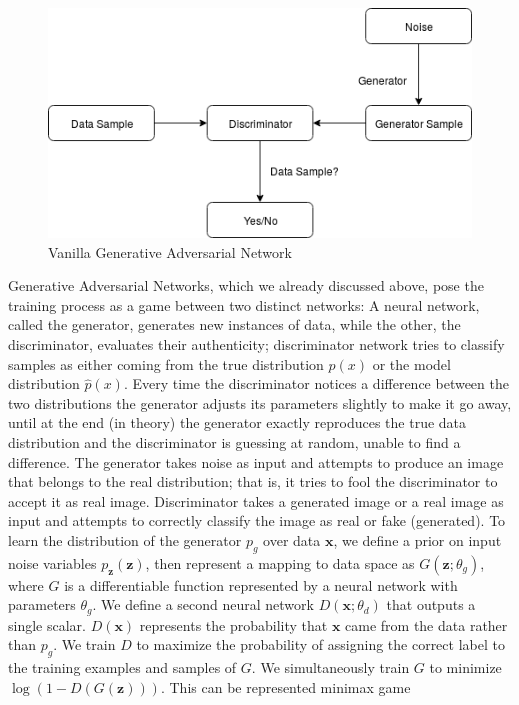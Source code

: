 \documentclass{vldb}
\begin{document}
\label{sec:generative_adversarial_networks}
\begin{figure}[H]
\includegraphics[width=\linewidth]{../Final_Report/images/vanillaGAN.png}
\caption{Vanilla Generative Adversarial Network}
\label{fig:gans}
\end{figure}

Generative Adversarial Networks, which we already discussed above, pose the training process as a game between two distinct networks: A neural network, called the generator, generates new instances of data, while the other, the discriminator, evaluates their authenticity; discriminator network tries to classify samples as either coming from the true distribution $p(x)$ or the model distribution $\hat{p}(x)$. Every time the discriminator notices a difference between the two distributions the generator adjusts its parameters slightly to make it go away, until at the end (in theory) the generator exactly reproduces the true data distribution and the discriminator is guessing at random, unable to find a difference.
The generator takes noise as input and attempts to produce an image that belongs to the real distribution; that is, it tries to fool the discriminator to accept it as real image. Discriminator takes a generated image or a real image as input and attempts to correctly classify the image as real or fake (generated).
To learn the distribution of the generator $p_g$ over data $\bm{x}$, we define a prior on input noise variables $p_{\bm{z}}(\bm{z})$, then represent a mapping to data space as $G(\bm{z}; \theta_g)$, where $G$ is a differentiable function represented by a neural network with parameters $\theta_g$. We define a second neural network $D(\bm{x}; \theta_d)$ that outputs a single scalar. $D(\bm{x})$ represents the probability that $\bm{x}$ came from the data rather than $p_g$. We train $D$ to maximize the probability of assigning the correct label to the training examples and samples of $G$. We simultaneously train $G$ to minimize $\log(1-D(G(\bm{z})))$.
This can be represented minimax game \\
\end{document}
